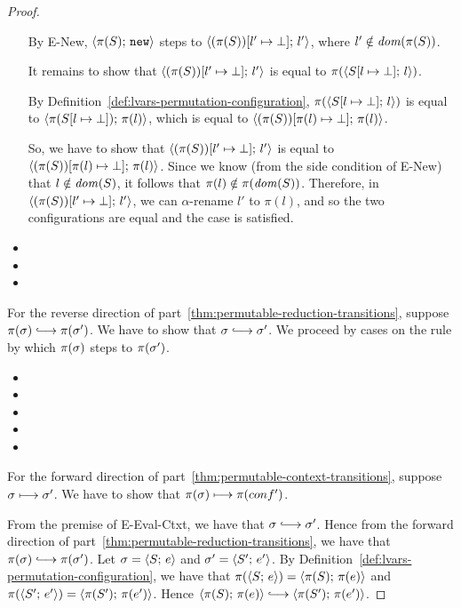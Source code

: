 \begin{proof}
\begin{itemize}
      By {\sc E-New}, $\langle \pi(S);\, \mbox{\texttt{new}} \rangle$ steps to
      $\langle (\pi(S))[l' \mapsto \bot];\, l' \rangle$, where $l' \notin
      \mathit{dom}(\pi(S))$.
      
      It remains to show that
      $\langle (\pi(S))[l' \mapsto \bot];\, l' \rangle$ is equal to
      $\pi(\langle S[l \mapsto \bot];\, l \rangle)$.

      By Definition~\ref{def:lvars-permutation-configuration},
      $\pi(\langle S[l \mapsto \bot];\, l \rangle)$ is equal to
      $\langle \pi(S[l \mapsto \bot]);\, \pi(l) \rangle$, which is equal to
      $\langle (\pi(S))[\pi(l) \mapsto \bot];\, \pi(l) \rangle$.

      So, we have to show that
      $\langle (\pi(S))[l' \mapsto \bot];\, l' \rangle$ is equal to
      $\langle (\pi(S))[\pi(l) \mapsto \bot];\, \pi(l) \rangle$.  Since we
      know (from the side condition of {\sc E-New}) that $l \notin
      \mathit{dom}(S)$, it follows that $\pi(l) \notin \pi(\mathit{dom}(S))$.
      Therefore, in $\langle (\pi(S))[l' \mapsto \bot];\, l' \rangle$, we
      can $\alpha$-rename $l'$ to $\pi(l)$, and so the two
      configurations are equal and the case is satisfied.

    \item {}
    \item {}
    \item {}
  \end{itemize}

  For the reverse direction of
  part~\ref{thm:permutable-reduction-transitions}, suppose $\pi(\conf)
  \parstepsto \pi(\conf')$.  We have to show that $\conf \parstepsto
  \conf'$.  We proceed by cases on the rule by which $\pi(\sigma)$
  steps to $\pi(\sigma')$.

  \begin{itemize}
    \item {}
    \item {}
    \item {}
    \item {}
    \item {}
  \end{itemize}

  For the forward direction of
  part~\ref{thm:permutable-context-transitions}, suppose $\sigma
  \longmapsto \sigma'$.  We have to show that $\pi(\sigma) \longmapsto
  \pi(conf')$.

  From the premise of {\sc E-Eval-Ctxt}, we have that $\conf
  \parstepsto \conf'$.  Hence from the forward direction of
  part~\ref{thm:permutable-reduction-transitions}, we have that
  $\pi(\conf) \parstepsto \pi(\conf')$.  Let $\sigma = \langle S;\, e \rangle$
  and $\sigma' = \langle S';\, e' \rangle$.  By
  Definition~\ref{def:lvars-permutation-configuration}, we have that
  $\pi(\langle S;\, e \rangle) = \langle \pi(S);\, \pi(e) \rangle$ and
  $\pi(\langle S';\, e' \rangle) = \langle \pi(S');\, \pi(e') \rangle$.  Hence
  $\config{\pi(S)}{\pi(e)} \parstepsto \config{\pi(S')}{\pi(e')}$.


\end{proof}

